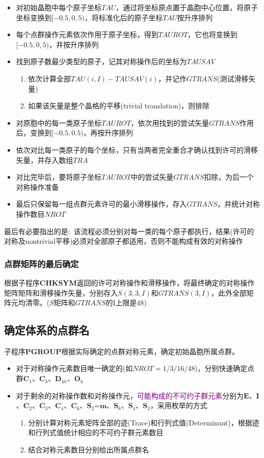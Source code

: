 \begin{itemize}
	\item 对初始晶胞中每个原子坐标$\mathit{TAU}$，通过将坐标原点置于晶胞中心位置，将原子坐标变换到$[-0.5,0,5)$，将标准化后的原子坐标$\mathit{TAU}$按升序排列
	\item 每个点群操作元素依次作用于原子坐标，得到$\mathit{TAUROT}$，它也将变换到$[-0.5,0,5)$，并按升序排列
	\item 找到原子数最少类型的原子，记其对称操作后的坐标为$\mathit{TAUSAV}$
		\begin{enumerate}
			\item 依次计算全部$\mathit{TAU}(i,I)-\mathit{TAUSAV(i)}$，并记作$\mathit{GTRANS}$(测试滑移矢量)
			\item 如果该矢量是整个晶格的平移(\textrm{trivial translation})，则排除
		\end{enumerate}
	\item 对原胞中的每一类原子坐标$TAUROT$，依次用找到的尝试矢量$\mathit{GTRANS}$作用后，变换到$[-0.5,0.5)$，再按升序排列
	\item 依次对比每一类原子的每个坐标，只有当两者完全重合才确认找到许可的滑移矢量，并存入数组$\mathit{TRA}$
	\item 对比完毕后，要将原子坐标$TAUROT$中的尝试矢量$\mathit{GTRANS}$扣除，为后一个对称操作准备
	\item 最后只保留每一组点群元素许可的最小滑移操作，存入$\mathit{GTRANS}$，并统计对称操作数目$\mathit{NROT}$
\end{itemize}
最后有必要指出的是:~该流程必须分别对每一类的每个原子都执行，结果(许可的对称及nontrivial平移)必须对全部原子都适用，否则不能构成有效的对称操作
\subsubsection{点群矩阵的最后确定}
根据子程序\textbf{CHKSYM}返回的许可对称操作和滑移操作，将最终确定的对称操作矩阵矩阵和滑移操作矢量，分别存入$\mathit{S}(3,3,I)$和$\mathit{GTRANS(3,I)}$，此外全部矩阵元均清零。($\mathit{S}$矩阵和$\mathit{GTRANS}$的I上限是48)
\subsection{确定体系的点群名}
子程序\textbf{PGROUP}根据实际确定的点群对称元素，确定初始晶胞所属点群。
\begin{itemize}
	\item 对于对称操作元素数目唯一确定的(如$\mathit{NROT}=1/3/16/48$)，分别快速确定点群$\mathbf{C}_1$、$\mathbf{C}_3$、$\mathbf{D}_{4h}$、$\mathbf{O}_h$
	\item 对于剩余的对称操作数和对称操作元，\textcolor{purple}{可能构成的不可约子群元素}分别为$\mathbf{E}$、$\mathbf{I}$、$\mathbf{C}_2$、$\mathbf{C}_3$、$\mathbf{C}_4$、$\mathbf{C}_6$、$\mathbf{S}_2$=$\mathbf{m}$、$\mathbf{S}_6$、$\mathbf{S}_4$、$\mathbf{S}_3$，采用枚举的方式
		\begin{enumerate}
			\item 分别计算对称元素矩阵全部的迹(\textrm{Trace})和行列式值(\textrm{Determinant})，根据迹和行列式值统计相应的不可约子群元素数目
			\item 结合对称元素数目分别给出所属点群名
		\end{enumerate}
\end{itemize}

